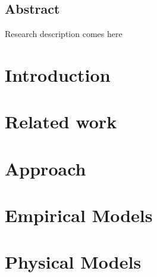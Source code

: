 \documentclass[a4paper,oneside]{book}
\begin{document}
	\section*{Abstract}
		Research description comes here
	\newpage
	\tableofcontents
	\newpage
	\hypersetup{pageanchor=true}
	\chapter{Introduction}
	
	\chapter{Related work}
	
	\chapter{Approach}
	
	\chapter{Empirical Models}
	
	\chapter{Physical Models}
	
 	\nocite{*}
	
	
	\printindex
\end{document}
